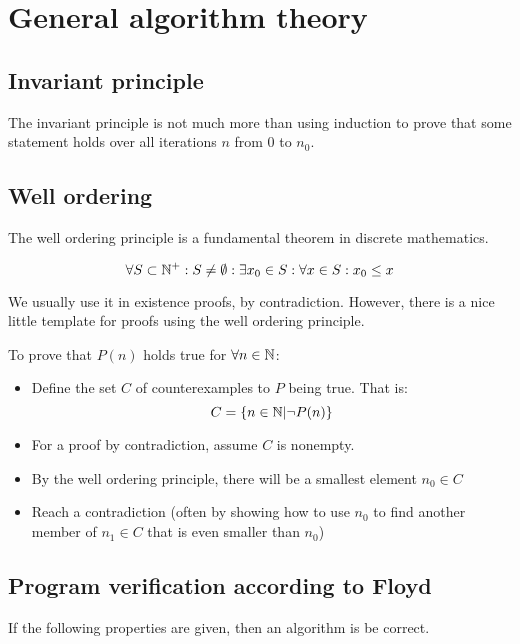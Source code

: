 \section{General algorithm theory}

\subsection{Invariant principle}

The invariant principle is not much more than using induction to prove that some statement holds over all iterations $n$ from $0$ to $n_0$.


\subsection{Well ordering}

The well ordering principle is a fundamental theorem in discrete mathematics. 

$$ \forall S \subset \mathbb{N}^+: S \neq \emptyset : \exists x_0 \in S: \forall x \in S: x_0 \leq x $$

We usually use it in existence proofs, by contradiction. However, there is a nice little template for proofs using the well ordering principle.

To prove that $P(n)$ holds true for $\forall n \in \mathbb{N}$:

\begin{itemize}
    \item Define the set $C$ of counterexamples to $P$ being true. That is: 
    $$ C = \{ n \in \mathbb{N} | \lnot P(n) \}$$
    
    \item For a proof by contradiction, assume $C$ is nonempty.
    
    \item By the well ordering principle, there will be a smallest element $n_0 \in C$
    
    \item Reach a contradiction (often by showing how to use $n_0$ to find another member of $n_1 \in C$ that is even smaller than $n_0$)
\end{itemize}


\subsection{Program verification according to Floyd}

If the following properties are given, then an algorithm is be correct. 

